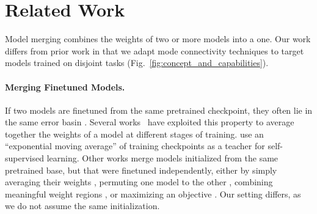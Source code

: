 
\section{Related Work} \label{sec:related_work}
Model merging combines the weights of two or more models into a one. Our work differs from prior work in that we adapt mode connectivity techniques to target models trained on disjoint tasks (Fig.~\ref{fig:concept_and_capabilities}).
 

\paragraph{Merging Finetuned Models.}
If two models are finetuned from the same pretrained checkpoint, they often lie in the same error basin \cite{neyshabur2020being}. 
Several works~\cite{huang2017snapshot,izmailov2018averaging,von2020neural,wortsman2022robust,ilharco2022patching,donyehiya2023cold} have exploited this property to average together the weights of a model at different stages of training. 
\citet{tarvainen2017mean,cai2021exponential,grill2020bootstrap,caron2021emerging,baevski2022data2vec} use an ``exponential moving average'' of training checkpoints as a teacher for self-supervised learning.
Other works merge models initialized from the same pretrained base, but that were finetuned independently, either by simply averaging their weights \cite{mcmahan2017communication,wortsman2022model,choshen2022fusing,rame2022recycling}, permuting one model to the other \cite{ashmore2015method,yurochkin2019bayesian,wang2020federated}, combining meaningful weight regions \cite{ilharco2022editing, gueta2023knowledge,yadav2023resolving,sung2023empirical}, or maximizing an objective \cite{matena2021merging}. Our setting differs, as we do not assume the same initialization.

\vspace{-0.2em}
